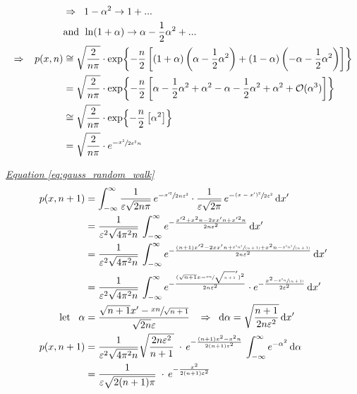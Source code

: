 \documentclass[a4paper, parskip=half]{scrartcl}
\newcommand{\diff}{\mathop{}\!\mathrm{d}}
\newcommand{\myEqRef}[1]{\textit{\hyperref[eq:#1]{Equation \ref*{eq:#1}}}}
\begin{document}
\begin{align}
&\Rightarrow\;\;  1-\alpha^2 \rightarrow 1 + ... \; \\
&\mathrm{and}\;\,\ln\!\left(1+\alpha\right) \rightarrow \alpha - \frac{1}{2}\alpha^2 + ... \\
\Rightarrow \;\;\; p(x,n) &\cong \sqrt{\frac{2}{n\pi}} \cdot \exp\!\left\lbrace-\frac{n}{2}\left[\left(1+\alpha\right)\left(\alpha - \frac{1}{2} \alpha^2 \right) +\left(1-\alpha\right)\left(-\alpha - \frac{1}{2} \alpha^2 \right)\right] \right\rbrace\\
&= \sqrt{\frac{2}{n\pi}} \cdot \exp\!\left\lbrace-\frac{n}{2}\left[\alpha -\frac{1}{2} \alpha^2 + \alpha^2 - \alpha - \frac{1}{2} \alpha^2 + \alpha^2 + \mathcal{O}(\alpha^3)\right] \right\rbrace \\
&\cong \sqrt{\frac{2}{n\pi}} \cdot \exp\!\left\lbrace-\frac{n}{2}\left[\alpha^2\right] \right\rbrace\\
&= \sqrt{\frac{2}{n\pi}} \cdot e^{-\sfrac{x^2}{2\varepsilon^2n}} 
\end{align}

\myEqRef{gauss_random_walk}
\begin{align}
p(x,n+1) &= \int_{-\infty}^\infty \frac{1}{\varepsilon\sqrt{2n\pi}}\, e^{-\sfrac{x'^2}{2n\varepsilon^2}} \cdot \frac{1}{\varepsilon\sqrt{2\pi}}\, e^{-\sfrac{(x - x')^2}{2\varepsilon^2}} \diff x'\\
&= \frac{1}{\varepsilon^2\sqrt{4\pi^2n}} \, \int_{-\infty}^\infty e^{-\frac{x'^2 + x^2n - 2xx'n +x'^2n}{2n\varepsilon^2}}\diff x' \\
&= \frac{1}{\varepsilon^2\sqrt{4\pi^2n}} \, \int_{-\infty}^\infty e^{-\frac{(n+1)x'^2 - 2xx'n + \sfrac{x^2n^2}{(n+1)} + x^2n - \sfrac{x^2n^2}{(n+1)}}{2n\varepsilon^2}}\diff x' \\
&= \frac{1}{\varepsilon^2\sqrt{4\pi^2n}} \, \int_{-\infty}^\infty e^{-\frac{(\sqrt{n+1}x - \sfrac{xn}{\sqrt{n+1}}')^2}{2n\varepsilon^2}} \cdot e^{- \frac{x^2 - \sfrac{x^2n}{(n+1)}}{2\varepsilon^2}}\diff x' \\
\mathrm{let}\;\;\; \alpha &= \frac{\sqrt{n+1}x' - \sfrac{xn}{\sqrt{n+1}}}{\sqrt{2n}\varepsilon}
\;\;\; \Rightarrow \;\;\diff\alpha = \sqrt{\frac{n+1}{2n\varepsilon^2}} \diff x' \notag\\
p(x,n+1) &= \frac{1}{\varepsilon^2\sqrt{4\pi^2n}} \sqrt{\frac{2n\varepsilon^2}{n+1}}\;\cdot\, e^{-\frac{(n+1)x^2 - x^2n}{2(n+1)\varepsilon^2}}\, \int_{-\infty}^\infty e^{-\alpha^2} \diff\alpha\notag\\
&= \frac{1}{\varepsilon\sqrt{2(n+1)\pi}}\;\cdot\, e^{-\frac{x^2}{2(n+1)\varepsilon^2}}\notag
\end{align}
\end{document}

